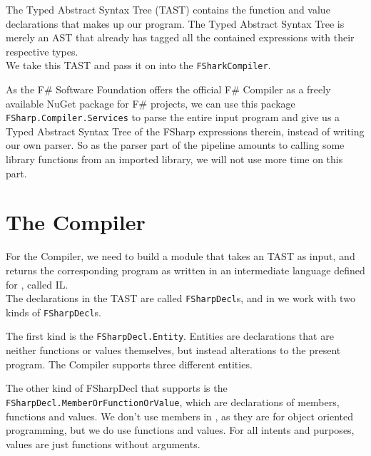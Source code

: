 The Typed Abstract Syntax Tree (TAST) contains the function and value declarations that makes up 
our \fshark{} program.
The Typed Abstract Syntax Tree is merely an AST that already has tagged all the
contained expressions with their respective types.\\
We take this TAST and pass it on into the \texttt{FSharkCompiler}.

As the F\# Software Foundation offers the official F\# Compiler as a freely
available NuGet package for F\# projects, we can use this package
\texttt{FSharp.Compiler.Services} to parse the entire input \fshark{} program and
give us a Typed Abstract Syntax Tree of the FSharp expressions therein, instead
of writing our own parser. So as the \fsharp{} parser part of the pipeline amounts to calling some library
functions from an imported library, we will not use more time on this part.

\section{The \fshark{}Compiler}
For the \fshark{}Compiler, we need to build a module that takes an \fsharp{}
TAST as input, and returns the corresponding program as written in an
intermediate language defined for \fshark{}, called \fshark{}IL.\\
The declarations in the TAST are called \texttt{FSharpDecl}s, and in \fshark{}
we work with two kinds of \texttt{FSharpDecl}s.

The first kind is the \texttt{FSharpDecl.Entity}. Entities are \fsharp{}
declarations that are neither functions or values
themselves, but instead alterations to the present \fsharp{} program. 
The \fshark{}Compiler supports three different entities.

The other kind of FSharpDecl that \fshark{} supports is the \texttt{FSharpDecl.MemberOrFunctionOrValue}, which are
declarations of members, functions and values. We don't use members in
\fshark{}, as they are for object oriented \fsharp{} programming, but we do use
functions and values. For all intents and purposes, \fsharp{} values are just
functions without arguments.

